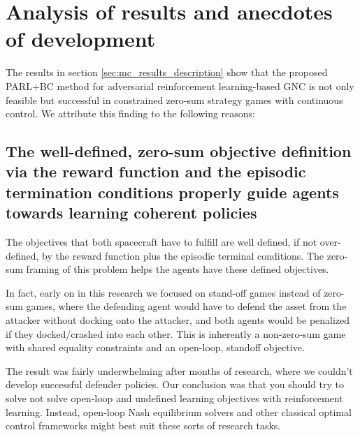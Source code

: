 

\section{Analysis of results and anecdotes of development}
\label{sec:analysis-and-anecdotes}

The results in section \ref{sec:mc_results_description} show that the proposed PARL+BC method for adversarial reinforcement learning-based GNC is not only feasible but successful in constrained zero-sum strategy games with continuous control. We attribute this finding to the following reasons:

\subsection*{The well-defined, zero-sum objective definition via the reward function and the episodic termination conditions properly guide agents towards learning coherent policies}

The objectives that both spacecraft have to fulfill are well defined, if not over-defined, by the reward function plus the episodic terminal conditions. The zero-sum framing of this problem helps the agents have these defined objectives.
    
In fact, early on in this research we focused on stand-off games instead of zero-sum games, where the defending agent would have to defend the asset from the attacker without docking onto the attacker, and both agents would be penalized if they docked/crashed into each other. This is inherently a non-zero-sum game with shared equality constraints and an open-loop, standoff objective.

The result was fairly underwhelming after months of research, where we couldn't develop successful defender policies. Our conclusion was that you should try to solve not solve open-loop and undefined learning objectives with reinforcement learning. Instead, open-loop Nash equilibrium solvers and other classical optimal control frameworks might best suit these sorts of research tasks.

